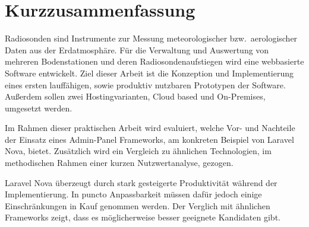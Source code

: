 \newpage


\section*{Kurzzusammenfassung}
Radiosonden sind Instrumente zur Messung meteorologischer bzw.\ aerologischer Daten aus der Erdatmosphäre.
Für die Verwaltung und Auswertung von mehreren Bodenstationen und deren Radiosondenaufstiegen wird eine webbasierte Software entwickelt.
Ziel dieser Arbeit ist die Konzeption und Implementierung eines ersten lauffähigen, sowie produktiv nutzbaren Prototypen der Software.
Außerdem sollen zwei Hostingvarianten, Cloud based und On-Premises, umgesetzt werden.

Im Rahmen dieser praktischen Arbeit wird evaluiert, welche Vor- und Nachteile der Einsatz eines Admin-Panel Frameworks, am konkreten Beispiel von Laravel Nova, bietet.
Zusätzlich wird ein Vergleich zu ähnlichen Technologien, im methodischen Rahmen einer kurzen Nutzwertanalyse, gezogen.

Laravel Nova überzeugt durch stark gesteigerte Produktivität während der Implementierung.
In puncto Anpassbarkeit müssen dafür jedoch einige Einschränkungen in Kauf genommen werden.
Der Verglich mit ähnlichen Frameworks zeigt, dass es möglicherweise besser geeignete Kandidaten gibt.

